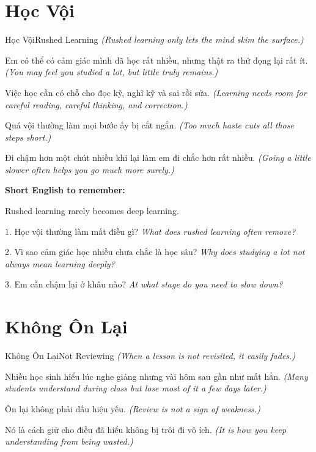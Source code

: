 \section{Học Vội}
\begin{truyen}{Học Vội}{Rushed Learning}
\textit{(Rushed learning only lets the mind skim the surface.)}

Em có thể có cảm giác mình đã học rất nhiều, nhưng thật ra thứ đọng lại rất ít.
\textit{(You may feel you studied a lot, but little truly remains.)}

Việc học cần có chỗ cho đọc kỹ, nghĩ kỹ và sai rồi sửa.
\textit{(Learning needs room for careful reading, careful thinking, and correction.)}

Quá vội thường làm mọi bước ấy bị cắt ngắn.
\textit{(Too much haste cuts all those steps short.)}
\end{truyen}

\begin{baihoc}
Đi chậm hơn một chút nhiều khi lại làm em đi chắc hơn rất nhiều.
\textit{(Going a little slower often helps you go much more surely.)}
\end{baihoc}

\begin{ghinhoanh}
\textbf{Short English to remember:}

Rushed learning rarely becomes deep learning.

\end{ghinhoanh}

\begin{tuhocnhanh}
1. Học vội thường làm mất điều gì? \textit{What does rushed learning often remove?}

2. Vì sao cảm giác học nhiều chưa chắc là học sâu? \textit{Why does studying a lot not always mean learning deeply?}

3. Em cần chậm lại ở khâu nào? \textit{At what stage do you need to slow down?}
\end{tuhocnhanh}
\ngancach

\section{Không Ôn Lại}
\begin{truyen}{Không Ôn Lại}{Not Reviewing}
\textit{(When a lesson is not revisited, it easily fades.)}

Nhiều học sinh hiểu lúc nghe giảng nhưng vài hôm sau gần như mất hẳn.
\textit{(Many students understand during class but lose most of it a few days later.)}

Ôn lại không phải dấu hiệu yếu.
\textit{(Review is not a sign of weakness.)}

Nó là cách giữ cho điều đã hiểu không bị trôi đi vô ích.
\textit{(It is how you keep understanding from being wasted.)}
\end{truyen}

